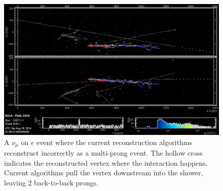 \documentclass[12pt,a4paper,final]{iopart}
\begin{document}
\begin{figure}
  \centering
  \includegraphics[width=\textwidth]{figures/2015/nelastic1npng3d1+.eps}
  \caption{A $\nu_\mu$ on $e$ event where the current reconstruction algorithms reconstruct incorrectly as a multi-prong event. The hollow cross indicates the reconstructed vertex where the interaction happens. Current algorithms pull the vertex downstream into the shower, leaving 2 back-to-back prongs.}
  \label{fig:multiprong}
\end{figure}

%
%
\end{document}
